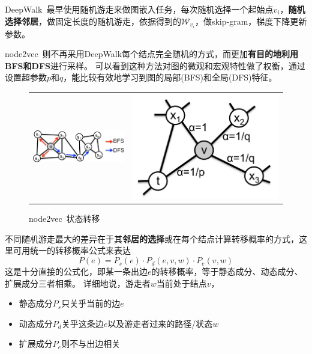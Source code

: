 \documentclass[reportComp]{thesis}
\begin{document}
DeepWalk~\cite{perozzi:deepwalk_kdd_2014}最早使用随机游走来做图嵌入任务，每次随机选择一个起始点$v_i$，\textbf{随机选择邻居}，做固定长度的随机游走，依据得到的$\mathcal{W}_{v_i}$，做skip-gram，梯度下降更新参数。

node2vec~\cite{grover:node2vec_kdd_2016}则不再采用DeepWalk每个结点完全随机的方式，而更加\textbf{有目的地利用BFS和DFS}进行采样。
可以看到这种方法对图的微观和宏观特性做了权衡，通过设置超参数$p$和$q$，能比较有效地学习到图的局部(BFS)和全局(DFS)特征。
\begin{figure}[H]
\centering
\begin{tabular}{cc}
\includegraphics[width=0.6\linewidth]{fig/node2vec.png} &
\includegraphics[width=0.3\linewidth]{fig/node2vec-transition.png}
\end{tabular}
\caption{node2vec~\cite{grover:node2vec_kdd_2016}状态转移}
\end{figure}

不同随机游走最大的差异在于其\textbf{邻居的选择}或在每个结点计算转移概率的方式\cite{yang:knightking_sosp_2019}，这里可用统一的转移概率公式来表达%
\[P(e)=P_s(e)\cdot P_d(e,v,w)\cdot P_e(v,w)\]
这是十分直接的公式化，即某一条出边$e$的转移概率，等于静态成分、动态成分、扩展成分三者相乘。
详细地说，游走者$w$当前处于结点$v$，
\begin{itemize}
	\item 静态成分$P_s$只关乎当前的边$e$
	\item 动态成分$P_d$关乎这条边$e$以及游走者过来的路径/状态$w$%
	\item 扩展成分$P_e$则不与出边相关%
\end{itemize}
\end{document}
